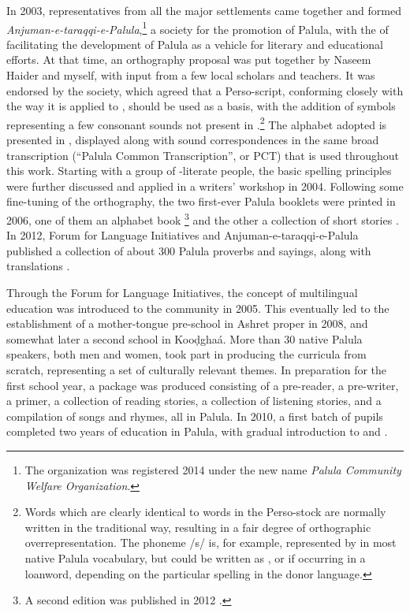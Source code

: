 In 2003, representatives from all the major settlements came together and formed \textit{Anjuman-e-taraqqi-e-Palula},\footnote{The organization was registered 2014 under the new name \textit{Palula Community Welfare Organization}.} a society for the promotion of Palula, with the  of facilitating the development of Palula as a vehicle for literary and educational efforts. At that time, an orthography proposal was put together by Naseem Haider and myself, with input from a few local scholars and teachers. It was endorsed by the society, which agreed that a Perso-\iliArabic script, conforming closely with the way it is applied to \iliUrdu, should be used as a basis, with the addition of symbols representing a few consonant sounds not present in \iliUrdu.\footnote{Words which are clearly identical to words in the Perso-\iliArabic stock are normally written in the traditional way, resulting in a fair degree of orthographic overrepresentation. The phoneme /s/ is, for example, represented by {\large{}} in most native Palula vocabulary, but could be written as {\large{}}, {\large{}} or {\large{}} if occurring in a loanword, depending on the particular spelling in the donor language.} The alphabet adopted is presented in , displayed along with sound correspondences in the same broad transcription (``Palula Common Transcription'', or PCT) that is used throughout this work. Starting with a group of \iliUrdu-literate people, the basic spelling principles were further discussed and applied in a writers’ workshop in 2004. Following some fine-tuning of the orthography, the two first-ever Palula booklets were printed in 2006, one of them an alphabet book \citep{haider2006a}\footnote{A second edition was published in 2012 \citep{haider2012a}.} and the other a collection of short stories \citep{haider2006b}. In 2012, Forum for Language Initiatives and Anjuman-e-taraqqi-e-Palula published a collection of about 300 Palula proverbs and sayings, along with \iliUrdu translations \citep{haider2012b}.


Through the Forum for Language Initiatives, the concept of multilingual education was introduced to the community in 2005. This eventually led to the establishment of a mother-tongue pre-school in Ashret proper in 2008, and somewhat later a second school in Kooḍghaá. More than 30 native Palula speakers, both men and women, took part in producing the curricula from scratch, representing a set of culturally relevant themes. In preparation for the first school year, a package was produced consisting of a pre-reader, a pre-writer, a primer, a collection of reading stories, a collection of listening stories, and a compilation of songs and rhymes, all in Palula. In 2010, a first batch of pupils completed two years of education in Palula, with gradual introduction to \iliUrdu and \iliEnglish \citep{rehmansagar2015}. 


